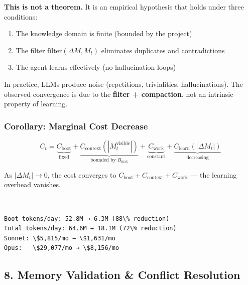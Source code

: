 \documentclass[11pt]{article}
\providecommand{\tightlist}{%
      \setlength{\itemsep}{0pt}\setlength{\parskip}{0pt}}
\begin{document}
\textbf{This is not a theorem.} It is an empirical hypothesis that holds
under three conditions:

\begin{enumerate}
\def\labelenumi{\arabic{enumi}.}
\tightlist
\item
  The knowledge domain is finite (bounded by the project)
\item
  The filter \(\text{filter}(\Delta M, M_t)\) eliminates duplicates and
  contradictions
\item
  The agent learns effectively (no hallucination loops)
\end{enumerate}

In practice, LLMs produce noise (repetitions, trivialities,
hallucinations). The observed convergence is due to the \textbf{filter +
compaction}, not an intrinsic property of learning.

\subsubsection{Corollary: Marginal Cost
Decrease}\label{corollary-marginal-cost-decrease}

\[C_t = \underbrace{C_{\text{boot}}}_{\text{fixed}} + \underbrace{C_{\text{context}}(|M_t^{\text{visible}}|)}_{\text{bounded by } B_{\max}} + \underbrace{C_{\text{work}}}_{\text{constant}} + \underbrace{C_{\text{learn}}(|\Delta M_t|)}_{\text{decreasing}}\]

As \(|\Delta M_t| \to 0\), the cost converges to
\(C_{\text{boot}} + C_{\text{context}} + C_{\text{work}}\) --- the
learning overhead vanishes.

    \begin{center}
    \end{center}
    { \hspace*{\fill} \\}
    
    \begin{Verbatim}[commandchars=\\\{\}]
Boot tokens/day: 52.8M → 6.3M (88\% reduction)
Total tokens/day: 64.6M → 18.1M (72\% reduction)
Sonnet: \$5,815/mo → \$1,631/mo
Opus:   \$29,077/mo → \$8,156/mo
    \end{Verbatim}

    \subsection{8. Memory Validation \& Conflict
Resolution}\label{memory-validation-conflict-resolution}
\end{document}
